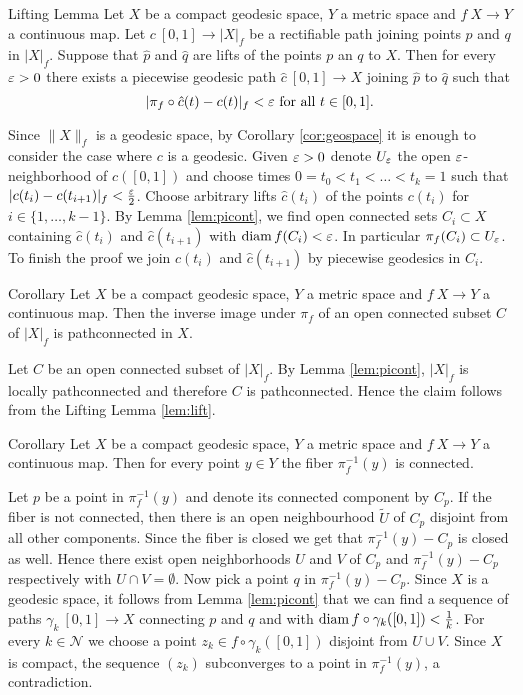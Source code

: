 \documentclass{article}
\begin{document}

\begin{thm}{Lifting Lemma}\label{lem:lift}
Let $X$ be a compact geodesic space, $Y$ a metric space and $f\:X\to Y$ a continuous map. Let $c\:[0,1]\to|X|_f$ be a rectifiable
path joining points $p$ and $q$ in $|X|_f$. Suppose that $\hat p$ and $\hat q$ are lifts of the points $p$ an $q$ to $X$.
Then for every $\varepsilon>0$ there exists a piecewise geodesic path $\hat c\:[0,1]\to X$ joining $\hat p$ to $\hat q$ such that 
\[|\pi_f\circ\hat c(t)-c(t)|_f<\varepsilon\ \text{for all}\ t\in[0,1].\]
\end{thm}

Since $\|X\|_f$ is a geodesic space, 
by Corollary \ref{cor:geospace} it is enough to consider the case where $c$ is a geodesic.
Given $\varepsilon>0$ denote $U_\varepsilon$ the open $\varepsilon$-neighborhood of $c([0,1])$ and choose times $0=t_0<t_1<\ldots<t_k=1$ 
such that $|c(t_i)-c(t_{i+1})|_f<\frac{\varepsilon}{2}$. Choose arbitrary lifts $\hat c(t_i)$ of the points
$c(t_i)$ for $i\in\{1,\ldots,k-1\}$.
By Lemma \ref{lem:picont}, we find open connected sets $C_i\subset X$ containing $\hat c(t_i)$ and $\hat c(t_{i+1})$ with
$\mathop{\rm diam}\nolimits f(C_i)<\varepsilon$. 
In particular $\pi_f(C_i)\subset U_\varepsilon$. 
To finish the proof we join $\hat c(t_i)$ and $\hat c(t_{i+1})$ by piecewise geodesics
 in $C_i$.
\qeds

\begin{thm}{Corollary}\label{cor:connecedpreimage}
Let $X$ be a compact geodesic space, $Y$ a metric space and $f\:X\to Y$ a continuous map. Then
the inverse image under $\pi_f$ of an open connected subset $C$ of $|X|_f$  is pathconnected in $X$.
\end{thm}
Let $C$ be an open connected subset of $|X|_f$. 
By Lemma \ref{lem:picont}, $|X|_f$ is locally pathconnected and therefore
$C$ is pathconnected. Hence the claim follows from the Lifting Lemma \ref{lem:lift}.
\qeds

\begin{thm}{Corollary}\label{cor:fiberconnected}
Let $X$ be a compact geodesic space, $Y$ a metric space and $f\:X\to Y$ a continuous map. Then
for every point $y\in Y$ the fiber $\pi_f^{-1}(y)$ is connected.
\end{thm}
Let $p$ be a point in $\pi_f^{-1}(y)$ and denote its connected component by $C_p$. 
If the fiber is not connected, then there is an
open neighbourhood $\tilde U$ of $C_p$ disjoint from all other components. Since the fiber is closed we get that $\pi_f^{-1}(y)-C_p$
is closed as well. Hence there exist open neighborhoods $U$ and $V$ of $C_p$ and $\pi_f^{-1}(y)-C_p$ respectively with $U\cap V=\emptyset$.
Now pick a point $q$ in  $\pi_f^{-1}(y)-C_p$. Since  $X$ is a geodesic space, it follows from Lemma \ref{lem:picont} that we can find a sequence
of paths $\gamma_k\:[0,1]\to X$ connecting $p$ and $q$ and with $\mathop{\rm diam}\nolimits f\circ\gamma_k([0,1])<\frac{1}{k}$. For every $k\in\mathcal{N}$ we choose a point 
$z_k\in f\circ\gamma_k([0,1])$ disjoint from $U\cup V$. Since $X$ is compact, the sequence $(z_k)$ subconverges to a point in $\pi_f^{-1}(y)$, a contradiction.
\qeds
\end{document}
